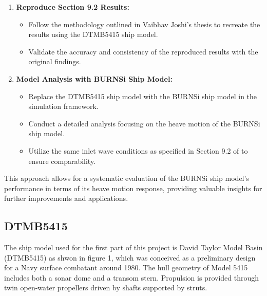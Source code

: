 \documentclass[12pt]{article} %
\begin{document}
\begin{enumerate}
    \item \textbf{Reproduce Section 9.2 Results:}
    \begin{itemize}
        \item Follow the methodology outlined in Vaibhav Joshi's thesis to recreate the results 
        using the DTMB5415 ship model.
        \item Validate the accuracy and consistency of the reproduced results with the original 
        findings.
    \end{itemize}
    \item \textbf{Model Analysis with BURNSi Ship Model:}
    \begin{itemize}
        \item Replace the DTMB5415 ship model with the BURNSi ship model in the simulation framework.
        \item Conduct a detailed analysis focusing on the heave motion of the BURNSi ship model.
        \item Utilize the same inlet wave conditions as specified in Section 9.2 of \cite{joshi2018} 
        to ensure comparability.
    \end{itemize}
\end{enumerate}

This approach allows for a systematic evaluation of the BURNSi ship model's performance in terms of 
its heave motion response, providing valuable insights for further improvements and applications.
\subsection{DTMB5415}

The ship model used for the first part of this project is David Taylor Model
Basin (DTMB5415) as shwon in figure 1, which was conceived as a preliminary design for a Navy surface 
combatant around 1980. The hull geometry of Model 5415 includes both a sonar dome and a transom stern. Propulsion is provided through twin open-water propellers driven by shafts supported by struts.
\end{document}
